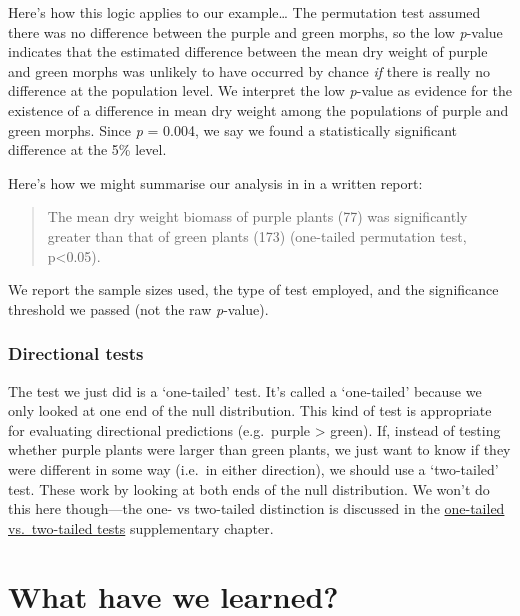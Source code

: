 \documentclass[
]{book}
\newenvironment{greybox}{
  \definecolor{shadecolor}{rgb}{0.95,0.95,0.95}  %
  \color{black}
  \begin{shaded}}
 {\end{shaded}}
\newenvironment{infobox}[1]
  {
  \begin{itemize}
  \renewcommand{\labelitemi}{
    \raisebox{-.7\height}[0pt][0pt]{
      {\setkeys{Gin}{width=3em,keepaspectratio}
        \texttt{[image: images/\#1]}}
    }
  }
  \setlength{\fboxsep}{1em}
  \begin{greybox}
  \item
  }
  {
  \end{greybox}
  \end{itemize}
  }
\begin{document}
Here's how this logic applies to our example\ldots{} The permutation test assumed there was no difference between the purple and green morphs, so the low \emph{p}-value indicates that the estimated difference between the mean dry weight of purple and green morphs was unlikely to have occurred by chance \emph{if} there is really no difference at the population level. We interpret the low \emph{p}-value as evidence for the existence of a difference in mean dry weight among the populations of purple and green morphs. Since \emph{p} = 0.004, we say we found a statistically significant difference at the 5\% level.

Here's how we might summarise our analysis in in a written report:

\begin{quote}
The mean dry weight biomass of purple plants (77) was significantly greater than that of green plants (173) (one-tailed permutation test, p\textless0.05).
\end{quote}

We report the sample sizes used, the type of test employed, and the significance threshold we passed (not the raw \emph{p}-value).

\begin{infobox}{information}

\hypertarget{directional-tests}{%
\subsubsection*{Directional tests}\label{directional-tests}}

The test we just did is a `one-tailed' test. It's called a `one-tailed' because we only looked at one end of the null distribution. This kind of test is appropriate for evaluating directional predictions (e.g.~purple \textgreater{} green). If, instead of testing whether purple plants were larger than green plants, we just want to know if they were different in some way (i.e.~in either direction), we should use a `two-tailed' test. These work by looking at both ends of the null distribution. We won't do this here though---the one- vs two-tailed distinction is discussed in the \protect\hyperlink{one-two-tailed-tests}{one-tailed vs.~two-tailed tests} supplementary chapter.

\end{infobox}

\hypertarget{what-have-we-learned}{%
\section{What have we learned?}\label{what-have-we-learned}}
\end{document}
